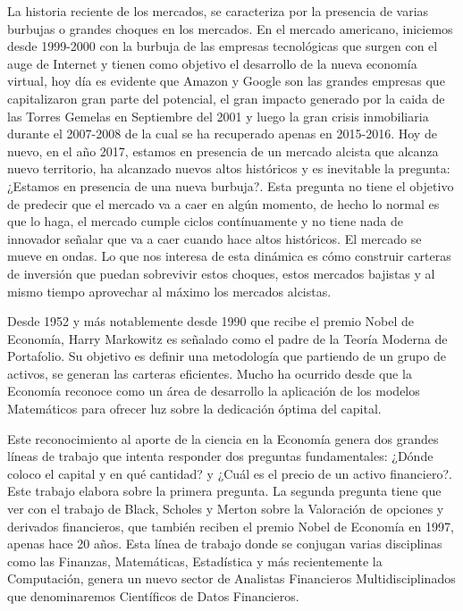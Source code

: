 \documentclass[
  12pt,
]{krantz}
\begin{document}
La historia reciente de los mercados, se caracteriza por la presencia de varias burbujas o grandes choques en los mercados. En el mercado americano, iniciemos desde 1999-2000 con la burbuja de las empresas tecnológicas que surgen con el auge de Internet y tienen como objetivo el desarrollo de la nueva economía virtual, hoy día es evidente que Amazon y Google son las grandes empresas que capitalizaron gran parte del potencial, el gran impacto generado por la caida de las Torres Gemelas en Septiembre del 2001 y luego la gran crisis inmobiliaria durante el 2007-2008 de la cual se ha recuperado apenas en 2015-2016. Hoy de nuevo, en el año 2017, estamos en presencia de un mercado alcista que alcanza nuevo territorio, ha alcanzado nuevos altos históricos y es inevitable la pregunta: ¿Estamos en presencia de una nueva burbuja?. Esta pregunta no tiene el objetivo de predecir que el mercado va a caer en algún momento, de hecho lo normal es que lo haga, el mercado cumple ciclos contínuamente y no tiene nada de innovador señalar que va a caer cuando hace altos históricos. El mercado se mueve en ondas. Lo que nos interesa de esta dinámica es cómo construir carteras de inversión que puedan sobrevivir estos choques, estos mercados bajistas y al mismo tiempo aprovechar al máximo los mercados alcistas.

Desde 1952 y más notablemente desde 1990 que recibe el premio Nobel de Economía, Harry Markowitz es señalado como el padre de la Teoría Moderna de Portafolio. Su objetivo es definir una metodología que partiendo de un grupo de activos, se generan las carteras eficientes. Mucho ha ocurrido desde que la Economía reconoce como un área de desarrollo la aplicación de los modelos Matemáticos para ofrecer luz sobre la dedicación óptima del capital.

Este reconocimiento al aporte de la ciencia en la Economía genera dos grandes líneas de trabajo que intenta responder dos preguntas fundamentales: ¿Dónde coloco el capital y en qué cantidad? y ¿Cuál es el precio de un activo financiero?. Este trabajo elabora sobre la primera pregunta. La segunda pregunta tiene que ver con el trabajo de Black, Scholes y Merton sobre la Valoración de opciones y derivados financieros, que también reciben el premio Nobel de Economía en 1997, apenas hace 20 años. Esta línea de trabajo donde se conjugan varias disciplinas como las Finanzas, Matemáticas, Estadística y más recientemente la Computación, genera un nuevo sector de Analistas Financieros Multidisciplinados que denominaremos Científicos de Datos Financieros.
\end{document}
